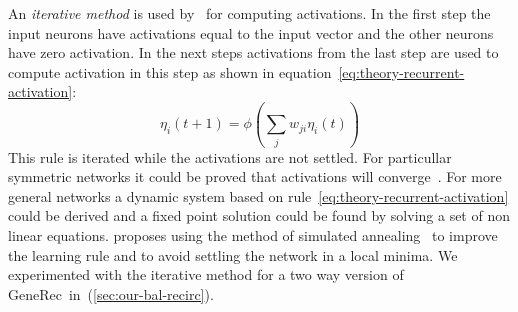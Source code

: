 An \emph{iterative method} is used by~\citet{movellan1990contrastive} for computing activations. In the first step the input neurons have activations equal to the input vector and the other neurons have zero activation. In the next steps activations from the last step are used to compute activation in this step as shown in equation~\ref{eq:theory-recurrent-activation}: 
\begin{equation}
  \label{eq:theory-recurrent-activation} 
  \eta_i(t+1) = \phi\left(\sum_j w_{ji}\eta_i(t)\right) 
\end{equation}
This rule is iterated while the activations are not settled. For particullar symmetric networks it could be proved that activations will converge~\citep{o1996bio}. For more general networks a dynamic system based on rule~\ref{eq:theory-recurrent-activation} could be derived and a fixed point solution could be found by solving a set of non linear equations. \citet{movellan1990contrastive} proposes using the method of simulated annealing~\citep{kirkpatrick1983optimization,vcerny1985thermodynamical} to improve the learning rule and to avoid settling the network in a local minima. We experimented with the iterative method for a two way version of GeneRec~in~(\ref{sec:our-bal-recirc}). 

